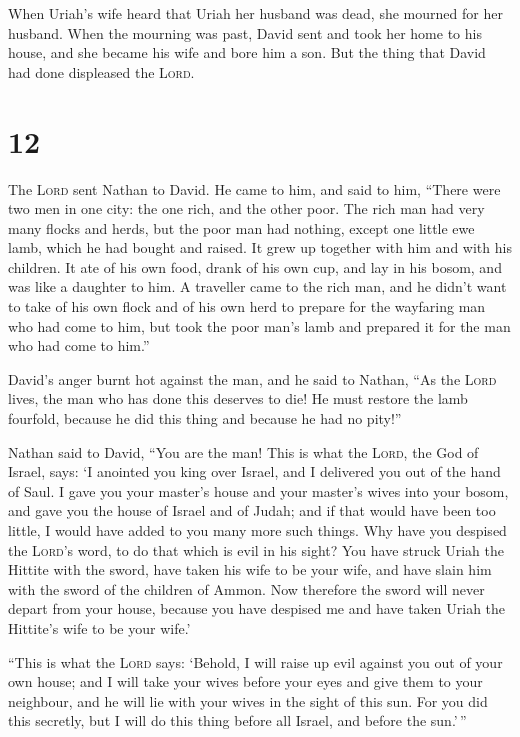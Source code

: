  When Uriah's wife heard that Uriah her husband was dead,
she mourned for her husband.  When the mourning was past,
David sent and took her home to his house, and she became his wife and
bore him a son. But the thing that David had done displeased the
\textsc{Lord}.

\hypertarget{section-11}{%
\section{12}\label{section-11}}

 The \textsc{Lord} sent Nathan to David. He came to him,
and said to him, ``There were two men in one city: the one rich, and the
other poor.  The rich man had very many flocks and herds,
 but the poor man had nothing, except one little ewe lamb,
which he had bought and raised. It grew up together with him and with
his children. It ate of his own food, drank of his own cup, and lay in
his bosom, and was like a daughter to him.  A traveller
came to the rich man, and he didn't want to take of his own flock and of
his own herd to prepare for the wayfaring man who had come to him, but
took the poor man's lamb and prepared it for the man who had come to
him.''

 David's anger burnt hot against the man, and he said to
Nathan, ``As the \textsc{Lord} lives, the man who has done this deserves
to die!  He must restore the lamb fourfold, because he did
this thing and because he had no pity!''

 Nathan said to David, ``You are the man! This is what the
\textsc{Lord}, the God of Israel, says: `I anointed you king over
Israel, and I delivered you out of the hand of Saul.  I
gave you your master's house and your master's wives into your bosom,
and gave you the house of Israel and of Judah; and if that would have
been too little, I would have added to you many more such things.
 Why have you despised the \textsc{Lord}'s word, to do
that which is evil in his sight? You have struck Uriah the Hittite with
the sword, have taken his wife to be your wife, and have slain him with
the sword of the children of Ammon.  Now therefore the
sword will never depart from your house, because you have despised me
and have taken Uriah the Hittite's wife to be your wife.'

 ``This is what the \textsc{Lord} says: `Behold, I will
raise up evil against you out of your own house; and I will take your
wives before your eyes and give them to your neighbour, and he will lie
with your wives in the sight of this sun.  For you did
this secretly, but I will do this thing before all Israel, and before
the sun.'\,''

